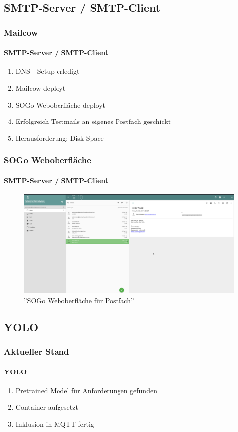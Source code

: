 \documentclass[]{beamer}
\begin{document}
\subsection{SMTP-Server / SMTP-Client}
\begin{frame}
	\frametitle{Mailcow}
	\framesubtitle{SMTP-Server / SMTP-Client}
	\begin{enumerate}
		\item DNS - Setup erledigt
		\item Mailcow deployt
		\item SOGo Weboberfläche deployt
		\item Erfolgreich Testmails an eigenes Postfach geschickt
		\item Herausforderung: Disk Space
	\end{enumerate}
\end{frame}

\begin{frame}
	\frametitle{SOGo Weboberfläche}
	\framesubtitle{SMTP-Server / SMTP-Client}
	\begin{figure}
		\begin{minipage}[t]{1\textwidth}
			\centering
			\includegraphics[width=\textwidth]{Images/SGO_Webmail.png}
		\end{minipage}
		\caption{''SOGo Weboberfläche für Postfach''}
	\end{figure}
\end{frame}

\subsection{YOLO}
\begin{frame}
	\frametitle{Aktueller Stand}
	\framesubtitle{YOLO}
	\begin{enumerate}
		\item Pretrained Model für Anforderungen gefunden
		\item Container aufgesetzt
		\item Inklusion in MQTT  fertig
	\end{enumerate}

\end{frame}
\end{document}
